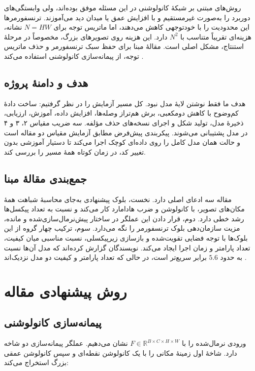 روش‌های مبتنی بر شبکهٔ کانولوشنی در این مسئله موفق بوده‌اند، ولی وابستگی‌های دوربرد را به‌صورت غیرمستقیم و با افزایش عمق یا میدان دید می‌آموزند. ترنسفورمرها این محدودیت را با خودتوجهی کاهش می‌دهند، اما ماتریس توجه برای $N=HW$ نشانه، هزینه‌ای تقریباً متناسب با $N^2$ دارد. این هزینه روی تصویرهای بزرگ، مخصوصاً در مرحلهٔ استنتاج، مشکل اصلی است. مقالهٔ مبنا برای حفظ سبک ترنسفورمر و حذف ماتریس توجه، از پیمانه‌سازی کانولوشنی استفاده می‌کند \cite{Gendy2023,Hou2022}.

\section{هدف و دامنهٔ پروژه}

هدف ما فقط نوشتن لایهٔ مدل نبود. کل مسیر آزمایش را در نظر گرفتیم: ساخت دادهٔ کم‌وضوح با کاهش دو‌مکعبی، برش هم‌تراز وصله‌ها، افزایش داده، آموزش، ارزیابی، ذخیرهٔ مدل، تولید شکل و اجرای نسخه‌های حذف مؤلفه. سه ضریب مقیاس ۲، ۳ و ۴ در مدل پشتیبانی می‌شوند. پیکربندی پیش‌فرض مطابق آزمایش مقیاس دو مقاله است و حالت  همان مدل کامل را روی داده‌ای کوچک اجرا می‌کند تا دستیار آموزشی بدون تغییر کد، در زمان کوتاه همهٔ مسیر را بررسی کند.

\section{جمع‌بندی مقالهٔ مبنا}

مقاله سه ادعای اصلی دارد. نخست، بلوک پیشنهادی به‌جای محاسبهٔ شباهت همهٔ مکان‌های تصویر، با کانولوشن و ضرب هادامارد کار می‌کند و نسبت به تعداد پیکسل‌ها رشد خطی دارد. دوم، قرار دادن این عملگر در ساختار پیش‌نرمال‌سازی‌شده و مانده، مزیت سازمان‌دهی بلوک ترنسفورمر را نگه می‌دارد. سوم، ترکیب چهار گروه از این بلوک‌ها با توجه فضایی تقویت‌شده و بازسازی زیرپیکسلی، نسبت مناسبی میان کیفیت، تعداد پارامتر و زمان اجرا ایجاد می‌کند. نویسندگان گزارش کرده‌اند که مدل آن‌ها نسبت به  حدود $5.6$ برابر سریع‌تر است، در حالی که تعداد پارامتر و کیفیت دو مدل نزدیک‌اند \cite{Gendy2023}.

\chapter{روش پیشنهادی مقاله}

\section{پیمانه‌سازی کانولوشنی}

ورودی نرمال‌شده را با $F\in\mathbb{R}^{B\times C\times H\times W}$ نشان می‌دهیم. عملگر پیمانه‌سازی دو شاخه دارد. شاخهٔ اول زمینهٔ مکانی را با یک کانولوشن نقطه‌ای و سپس کانولوشن عمقی بزرگ استخراج می‌کند:

